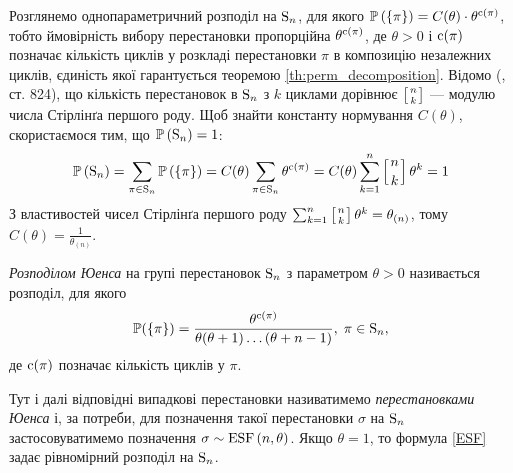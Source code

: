 Розглянемо однопараметричний розподіл на $\mathrm{S}_{n}$, для якого
$\mathbb{P}\left(\left\{ \pi \right\}\right) = C(\theta) \cdot \theta^{\operatorname{c}(\pi)}$, тобто
ймовірність вибору перестановки пропорційна
$\theta^{\operatorname{c}(\pi)}$, де $\theta > 0$ і $\operatorname{c}(\pi)$ позначає кількість циклів у
розкладі перестановки $\pi$ в композицію незалежних циклів, єдиність якої гарантується теоремою \ref{th:perm_decomposition}.
Відомо (\cite{Abramowitz_Stegun}, ст. 824), що кількість
перестановок в $\mathrm{S}_{n}$ з $k$ циклами дорівнює 
$\left[{n\atop k}\right]$ --- модулю числа Стірлінґа першого роду. Щоб знайти
константу нормування $C(\theta)$, скористаємося тим, що
$\mathbb{P}\left(\mathrm{S}_{n}\right) = 1$:
\begin{gather*}
    \mathbb{P}\left(\mathrm{S}_{n}\right) = \sum_{\pi \in \mathrm{S}_{n}} \mathbb{P}\left(\left\{ \pi \right\}\right) = 
    C(\theta) \sum_{\pi \in \mathrm{S}_{n}} \theta^{\operatorname{c}(\pi)} = 
    C(\theta) \sum_{k=1}^n \left[{n\atop k}\right] \theta^k = 1
\end{gather*}
З властивостей чисел Стірлінґа першого роду
$\sum_{k=1}^n \left[{n\atop k}\right] \theta^k = \theta_{(n)}$, тому
$C(\theta) = \frac{1}{\theta_{(n)}}$.
\begin{definition}
    \emph{Розподілом Юенса} на групі перестановок $\mathrm{S}_{n}$ з параметром $\theta > 0$
    називається розподіл, для якого
    \begin{equation}\label{ESF}
        \mathbb{P}(\{\pi\}) = \frac{
            \theta^{\operatorname{c}(\pi)}
        }{
            \theta (\theta + 1) \dots (\theta + n - 1)
        }, \; \pi \in \mathrm{S}_{n},
    \end{equation}
    де $\operatorname{c}(\pi)$ позначає кількість циклів у $\pi$.
\end{definition}
Тут і далі
відповідні випадкові перестановки називатимемо
\emph{перестановками Юенса} і, за потреби, для позначення
такої перестановки $\sigma$ на $\mathrm{S}_{n}$ застосовуватимемо
позначення $\sigma \sim \mathrm{ESF}\left(n, \theta\right)$.
Якщо $\theta = 1$, то формула \eqref{ESF} задає рівномірний розподіл на $\mathrm{S}_{n}$.

